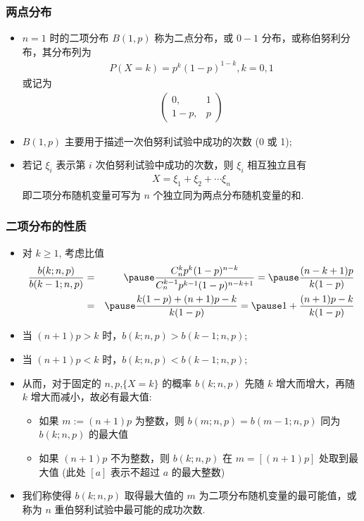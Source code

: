 \documentclass[Prob-All.tex]{subfiles}
\begin{document}
\begin{frame}
	\frametitle{两点分布}
	\begin{itemize}
		\item $n=1$ 时的二项分布 $B (1,p)$ 称为二点分布，或 $0-1$ 分布，或称伯努利分布，其分布列为
		      \begin{eqnarray*}
			      P(X=k)=p^k(1-p)^{1-k}, k=0, 1
		      \end{eqnarray*}
		      或记为
		      \begin{eqnarray*}
			      \left(\begin{array}{cc}
				      0,   & 1  \\
				      1-p, & p
			      \end{array}\right)
		      \end{eqnarray*}
		\item $B (1,p)$ 主要用于描述一次伯努利试验中成功的次数 (0 或 1);
		\item 若记 $\xi_i$ 表示第 $i$ 次伯努利试验中成功的次数，则 $\xi_i$ 相互独立且有
		      \begin{eqnarray*}
			      X=\xi_1+\xi_2+\cdots \xi_n
		      \end{eqnarray*}
		      即二项分布随机变量可写为 $n$ 个独立同为两点分布随机变量的和.
	\end{itemize}
\end{frame}
\begin{frame}
	\frametitle{二项分布的性质}
	\begin{itemize}[<+-|alert@+>]
		\item 对 $k\ge 1$, 考虑比值
		      \begin{eqnarray*}
			      \dfrac{b(k;n,p)}{b(k-1;n,p)}&=&\pause \dfrac{C_n^kp^k(1-p)^{n-k}}{C_n^{k-1}p^{k-1}(1-p)^{n-k+1}}=\pause \dfrac{(n-k+1)p}{k(1-p)}\\
			      &=&\pause \dfrac{k(1-p)+(n+1)p-k}{k(1-p)}=\pause 1+\dfrac{(n+1)p-k}{k(1-p)}
		      \end{eqnarray*}
		\item 当 $(n+1) p>k$ 时，$b (k;n,p)>b (k-1;n,p)$;
		\item 当 $(n+1) p<k$ 时，$b (k;n,p)<b (k-1;n,p)$;
		\item 从而，对于固定的 $n,p$,$\{X=k\}$ 的概率 $b (k;n,p)$ 先随 $k$ 增大而增大，再随 $k$ 增大而减小，故必有最大值:
		      \begin{itemize}
			      \item 如果 $m:=(n+1) p$ 为整数，则 $b (m;n,p)=b (m-1;n,p)$ 同为 $b (k;n,p)$ 的最大值
			      \item 如果 $(n+1) p$ 不为整数，则 $b (k;n,p)$ 在 $m=[(n+1) p]$ 处取到最大值 (此处 $[a]$ 表示不超过 $a$ 的最大整数)
		      \end{itemize}
		\item 我们称使得 $b (k;n,p)$ 取得最大值的 $m$ 为二项分布随机变量的最可能值，或称为 $n$ 重伯努利试验中最可能的成功次数.
	\end{itemize}
\end{frame}
\end{document}
